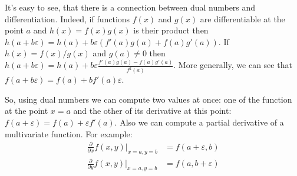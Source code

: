 \documentclass[reprint,amsmath,amssymb,aps,pre,showkeys,showpacs]{revtex4-1}
\begin{document}
It's easy to see, that there is a connection between dual numbers and
differentiation. Indeed, if functions $f(x)$ and $g(x)$
are differentiable at the point $a$ and $h(x) = f(x)g(x)$ is their product then
$h(a + b\varepsilon) = h(a) + b\varepsilon(f'(a)g(a) + f(a)g'(a))$.
If $h(x) = f(x)/g(x)$ and $g(a) \ne 0$ then
$h(a + b\varepsilon) = h(a) + b\varepsilon\frac{f'(a)g(a) - f(a)g'(a)}{f^2(a)}$.
More generally, we can see that $f(a + b\varepsilon) = f(a) + bf'(a)\varepsilon$.

So, using dual numbers we can compute two values at once: one of the function at
the point $x = a$ and the other of its derivative at this point:
$f(a + \varepsilon) = f(a) + \varepsilon f'(a)$. Also we can compute a partial
derivative of a multivariate function. For example:
\begin{align*}
  \frac{\partial}{\partial x} f(x, y) \vert_{x = a, y = b} &= f(a + \varepsilon,
  b) \\
  \frac{\partial}{\partial y} f(x, y) \vert_{x = a, y = b} &= f(a, b +
  \varepsilon)
\end{align*}
\end{document}
